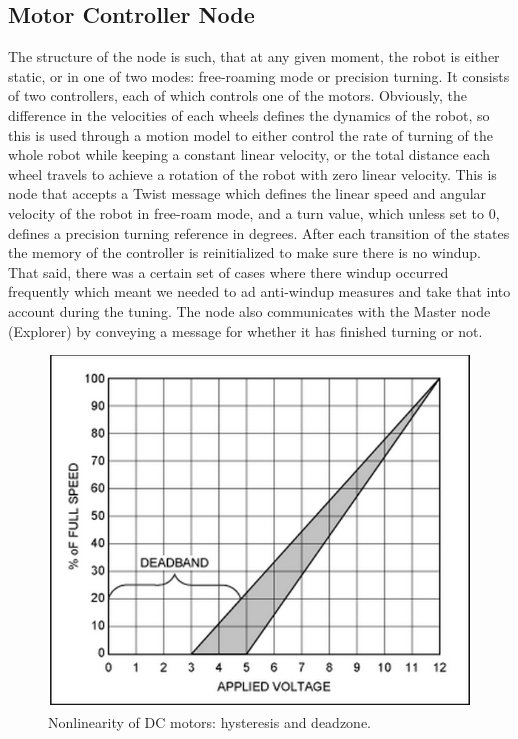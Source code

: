 \documentclass[10pt,a4paper,twocolumn]{article}
\begin{document}
\subsection{Motor Controller Node}
The structure of the node is such, that at any given moment, the robot is either
static, or in one of two modes: free-roaming mode or precision turning. It
consists of two controllers, each of which controls one of the motors.
Obviously, the difference in the velocities of each wheels defines the dynamics
of the robot, so this is used through a motion model to either control the rate
of turning of the whole robot while keeping a constant linear velocity, or the
total distance each wheel travels to achieve a rotation of the robot with zero
linear velocity. This is node that accepts a Twist message which defines the
linear speed and angular velocity of the robot in free-roam mode, and a turn
value, which unless set to 0, defines a precision turning reference in degrees.
After each transition of the states the memory of the controller is
reinitialized to make sure there is no windup. That said, there was a certain
set of cases where there windup occurred frequently which meant we needed to ad
anti-windup measures and take that into account during the tuning. The node also
communicates with the Master node (Explorer) by conveying a message for whether
it has finished turning or not.

\begin{figure}
  \centering
  \includegraphics[width=\linewidth]{images/deadband.png}
  \caption{Nonlinearity of DC motors: hysteresis and deadzone.}
  \label{fig:deadband}
\end{figure}
\end{document}
